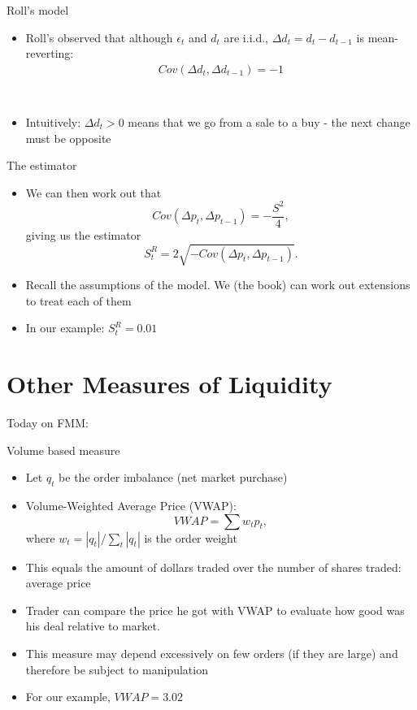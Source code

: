 \documentclass[english,10pt]{beamer}
\begin{document}
\begin{frame}{Roll's model}
	\begin{itemize}
		\item Roll's observed that although $\epsilon_t$ and $d_t$ are i.i.d., $\Delta d_t = d_t - d_{t-1}$ is mean-reverting:
		\begin{align*}
		Cov(\Delta d_t, \Delta d_{t-1})	= -1
		\\
		\\
		\\
		\\
		\\
		\end{align*}
		\item Intuitively: $\Delta d_t>0$ means that we go from a sale to a buy - the next change must be opposite
	\end{itemize}
\end{frame}


\begin{frame}{The estimator}
	\begin{itemize}
		\item We can then work out that
		\[
		Cov(\Delta p_t, \Delta p_{t-1}) = - \frac{S^2}{4},
		\]
		giving us the estimator
		\[
		S^R_t = 2 \sqrt{-Cov(\Delta p_t, \Delta p_{t-1})}.
		\]
		\item Recall the assumptions of the model. We (the book) can work out extensions to treat each of them
		\item In our example: $S^R_t = 0.01$
	\end{itemize}
\end{frame}


\section{Other Measures of Liquidity}

\begin{frame}{Today on FMM:}
	\tableofcontents[currentsection]
\end{frame}


\begin{frame}{Volume based measure}
\begin{itemize}
	\item Let $q_t$ be the order imbalance (net market purchase)
	\item \alert{Volume-Weighted Average Price} (VWAP):
	\[
	VWAP = \sum  w_t p_t,
	\]
	where $w_t = |q_t|/\sum_t |q_t|$ is the order weight
	\item  This equals the amount of dollars traded over the number of shares traded: average price
	\item Trader can compare the price he got with VWAP to evaluate how good was his deal relative to market.
	\item This measure may depend excessively on few orders (if they are large) and therefore be subject to manipulation
	\item For our example, $VWAP=3.02$
\end{itemize}
\end{frame}
\end{document}
